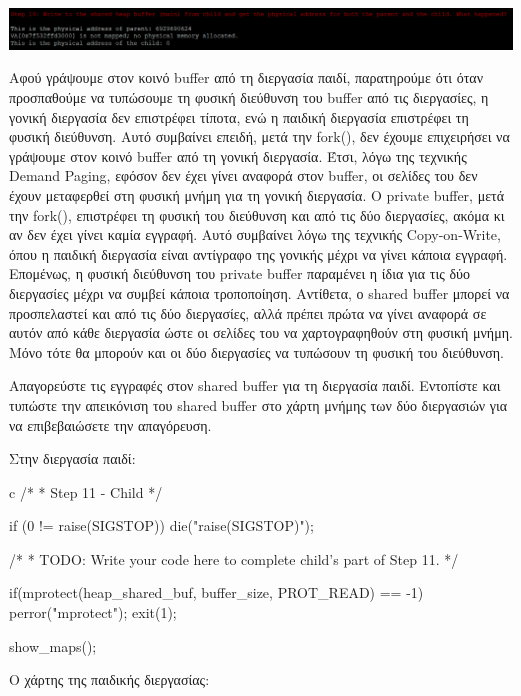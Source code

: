 \documentclass[12pt]{article}
\begin{document}
\centerline{\includegraphics[width=1\textwidth]{3_1_10.png}}

Αφού γράψουμε στον κοινό buffer από τη διεργασία παιδί, παρατηρούμε ότι όταν 
προσπαθούμε να τυπώσουμε τη φυσική διεύθυνση του buffer από τις διεργασίες, 
η γονική διεργασία δεν επιστρέφει τίποτα, ενώ η παιδική διεργασία επιστρέφει 
τη φυσική διεύθυνση. 
Αυτό συμβαίνει επειδή, μετά την fork(), δεν έχουμε επιχειρήσει να γράψουμε στον 
κοινό buffer από τη γονική διεργασία. Έτσι, λόγω της τεχνικής Demand Paging, 
εφόσον δεν έχει γίνει αναφορά στον buffer, οι σελίδες του δεν έχουν μεταφερθεί 
στη φυσική μνήμη για τη γονική διεργασία.
Ο private buffer, μετά την fork(), επιστρέφει τη φυσική του διεύθυνση και από 
τις δύο διεργασίες, ακόμα κι αν δεν έχει γίνει καμία εγγραφή. 
Αυτό συμβαίνει λόγω της τεχνικής Copy-on-Write, όπου η παιδική διεργασία 
είναι αντίγραφο της γονικής μέχρι να γίνει κάποια εγγραφή. Επομένως, η φυσική 
διεύθυνση του private buffer παραμένει η ίδια για τις δύο διεργασίες μέχρι να 
συμβεί κάποια τροποποίηση.
Αντίθετα, ο shared buffer μπορεί να προσπελαστεί και από τις δύο διεργασίες, 
αλλά πρέπει πρώτα να γίνει αναφορά σε αυτόν από κάθε διεργασία ώστε οι σελίδες του 
να χαρτογραφηθούν στη φυσική μνήμη. Μόνο τότε θα μπορούν και οι δύο 
διεργασίες να τυπώσουν τη φυσική του διεύθυνση.


\begin{question}
Απαγορεύστε τις εγγραφές στον shared buffer για τη διεργασία παιδί. Εντοπίστε και
τυπώστε την απεικόνιση του shared buffer στο χάρτη μνήμης των δύο διεργασιών
για να επιβεβαιώσετε την απαγόρευση.
\end{question}

Στην διεργασία παιδί:

\begin{codeless}{c}
    /*
    * Step 11 - Child
    */

   if (0 != raise(SIGSTOP))
   {
       die("raise(SIGSTOP)");
   }

   /*
    * TODO: Write your code here to complete child's part of Step 11.
    */
   
   if(mprotect(heap_shared_buf, buffer_size, PROT_READ) == -1)
   {
       perror("mprotect");
       exit(1);
   }

   show_maps();
\end{codeless}

Ο χάρτης της παιδικής διεργασίας:
\end{document}

